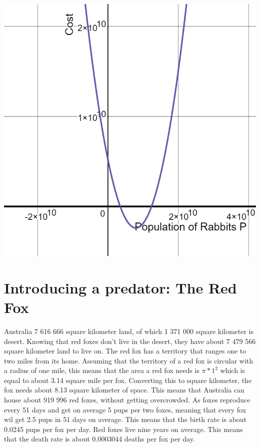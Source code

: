 \documentclass{article}
\begin{document}
\includegraphics[scale=0.3]{Pictures/CostH}
\\



\section{Introducing a predator: The Red Fox}
Australia 7 616 666 square kilometer land, of which 1 371 000 square kilometer is desert. Knowing that red foxes don't live in the desert, they have about 7 479 566 square kilometer land to live on. The red fox has a territory that ranges one to two miles from its home. Assuming that the territory of a red fox is circular with a radius of one mile, this means that the area a red fox needs is $\pi*1^2$ which is equal to about 3.14 square mile per fox.\cite{FoxTerritoryReproduction} Converting this to square kilometer, the fox needs about 8.13 square kilometer of space. This means that Australia can house about 919 996 red foxes, without getting overcrowded. As foxes reproduce every 51 days and get on average 5 pups per two foxes, meaning that every fox wil get 2.5 pups in 51 days on average.\cite{FoxTerritoryReproduction} This means that the birth rate is about 0.0245 pups per fox per day. Red foxes live nine years on average.\cite{FoxLife} This means that the death rate is about 0.0003044 deaths per fox per day.
\end{document}
